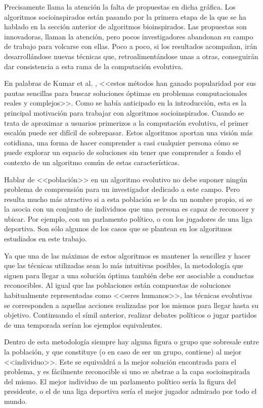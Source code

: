 Precisamente llama la atención la falta de propuestas en dicha gráfica. Los algoritmos socioinspirados están pasando por la primera etapa de la que se ha hablado en la sección anterior de algoritmos bioinspirados. Las propuestas son innovadoras, llaman la atención, pero pocos investigadores abandonan su campo de trabajo para volcarse con ellas. Poco a poco, si los resultados acompañan, irán desarrollándose nuevas técnicas que, retroalimentándose unas a otras, conseguirán dar consistencia a esta rama de la computación evolutiva.

En palabras de Kumar et al. \cite{socio-evolution-algorithm}, <<estos métodos han ganado popularidad por sus pautas sencillas para buscar soluciones óptimas en problemas computacionales reales y complejos>>. Como se había anticipado en la introducción, esta es la principal motivación para trabajar con algoritmos socioinspirados. Cuando se trata de aproximar a usuarios primerizos a la computación evolutiva, el primer escalón puede ser difícil de sobrepasar. Estos algoritmos aportan una visión más cotidiana, una forma de hacer comprender a casi cualquier persona cómo se puede explorar un espacio de soluciones sin tener que comprender a fondo el contexto de un algoritmo común de estas características.

Hablar de <<población>> en un algoritmo evolutivo no debe suponer ningún problema de comprensión para un investigador dedicado a este campo. Pero resulta mucho más atractivo si a esta población se le da un nombre propio, si se la asocia con un conjunto de individuos que una persona es capaz de reconocer y ubicar. Por ejemplo, con un parlamento político, o con los jugadores de una liga deportiva. Son sólo algunos de los casos que se plantean en los algoritmos estudiados en este trabajo.

Ya que una de las máximas de estos algoritmos es mantener la sencillez y hacer que las técnicas utilizadas sean lo más intuitivas posibles, la metodología que siguen para llegar a una solución óptima también debe ser asociable a conductas reconocibles. Al igual que las poblaciones están compuestas de soluciones habitualmente representadas como <<seres humanos>>, las técnicas evolutivas se corresponden a aquellas acciones realizadas por los mismos para llegar hasta su objetivo. Continuando el símil anterior, realizar debates políticos o jugar partidos de una temporada serían los ejemplos equivalentes.

Dentro de esta metodología siempre hay alguna figura o grupo que sobresale entre la población, y que constituye (o en caso de ser un grupo, contiene) al mejor <<individuo>>. Este se equivaldrá a la mejor solución encontrada para el problema, y es fácilmente reconocible si uno se abstrae a la capa socioinspirada del mismo. El mejor individuo de un parlamento político sería la figura del presidente, o el de una liga deportiva sería el mejor jugador admirado por todo el mundo.

